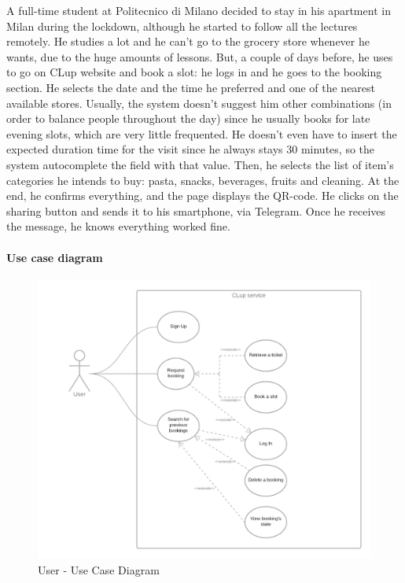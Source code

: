 \documentclass[table, 12pt]{article}
\begin{document}
\begin{flushleft}
    A full-time student at Politecnico di Milano decided to stay in his apartment in Milan during the lockdown, although he started to follow all the lectures remotely. He studies a lot and he can't go to the grocery store whenever he wants, due to the huge amounts of lessons. But, a couple of days before, he uses to go on CLup website and book a slot: he logs in and he goes to the booking section. He selects the date and the time he preferred and one of the nearest available stores. Usually, the system doesn't suggest him other combinations (in order to balance people throughout the day) since he usually books for late evening slots, which are very little frequented. He doesn't even have to insert the expected duration time for the visit since he always stays 30 minutes, so the system autocomplete the field with that value. Then, he selects the list of item's categories he intends to buy: pasta, snacks, beverages, fruits and cleaning. At the end, he confirms everything, and the page displays the QR-code. He clicks on the sharing button and sends it to his smartphone, via Telegram. Once he receives the message, he knows everything worked fine.\\



    \paragraph{Use case diagram}
    \begin{figure}[H]
        \begin{center}
            \includegraphics[width=\textwidth]{assets/use_case_diagram_user.png}
            \caption{User - Use Case Diagram}
        \end{center}
    \end{figure}

\end{flushleft}
\end{document}
